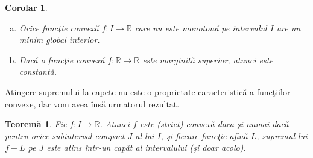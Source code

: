 \documentclass[a4paper,12pt,oneside]{report}
\newtheorem{theorem}{Teorem\u a}
\newtheorem{corollary}{Corolar}
\begin{document}
\begin{corollary}
\begin{enumerate}[a)]
\item Orice func\c{t}ie convex\u{a} \(f: I \rightarrow \mathbb{R}\) care nu este monoton\u{a} pe
intervalul \(I\) are un minim global interior.
\item Dac\u{a} o func\c{t}ie convex\u{a} \(f: \mathbb{R} \rightarrow \mathbb{R}\) este marginit\u{a} superior, atunci este constant\u{a}.
\end{enumerate}
\end{corollary}
Atingere supremului la capete nu este o proprietate caracteristic\u{a} a func\c{t}iilor convexe, dar vom avea \^{i}ns\u{a} urmatorul rezultat.

\begin{theorem}

Fie \(f: I \rightarrow \mathbb{R}\). Atunci \(f\) este (strict) convex\u{a} daca \c{s}i numai dac\u{a} pentru orice subinterval compact \(J\) al lui \(I\), \c{s}i fiecare func\c{t}ie afin\u{a} \(L\), supremul lui \(f+L\) pe \(J\) este atins \^{i}ntr-un cap\u{a}t al intervalului (\c{s}i doar acolo).
\end{theorem}
\end{document}
